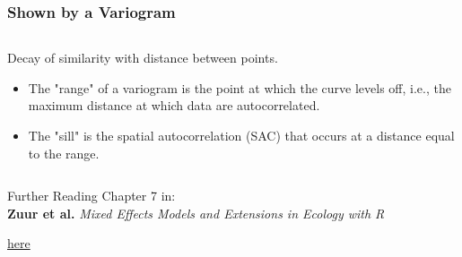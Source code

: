 \documentclass{beamer}
\newenvironment{VerbatimIN}
 {\VerbatimEnvironment
  \begin{tcolorbox}[
    breakable,
    colback=lightgray,
    spartan
  ]%
  \begin{Verbatim}}
 {\end{Verbatim}\end{tcolorbox}}
\begin{document}
\begin{frame}[fragile]
    \frametitle{Shown by a Variogram}
    \begin{columns}
        \begin{column}{0.5\textwidth}
            Decay of similarity with distance between points.
            \begin{itemize}
                \item The "range" of a variogram is the point at which the curve levels off, i.e., the maximum distance at which data are autocorrelated.
                \item The "sill" is the spatial autocorrelation (SAC) that occurs at a distance equal to the range.
                \end{itemize}
        \end{column}
    \end{columns}
\end{frame}

\begin{frame}{Further Reading}
\centering
  \Large Chapter 7 in: \\
  \textbf{Zuur et al.} \emph{Mixed Effects Models and Extensions in Ecology with R}
  \vspace{0.5cm}
  
  \color{blue}\href{http://highstat.com/index.php/mixed-effects-models-and-extensions-in-ecology-with-r}{here}
\end{frame}
\end{document}
